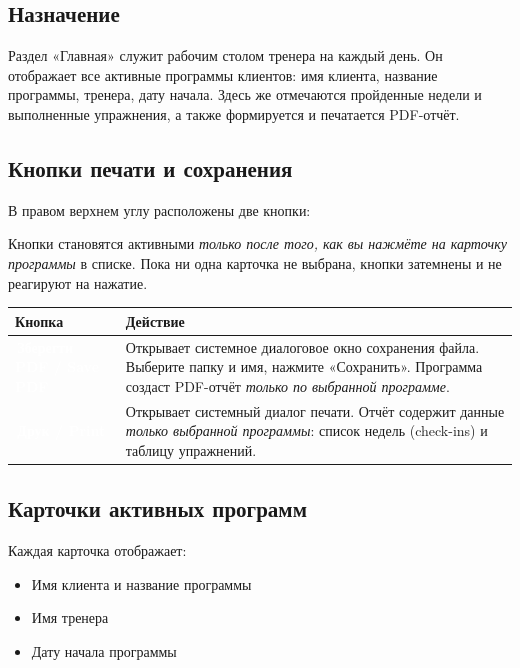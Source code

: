 \documentclass[12pt,a4paper]{article}
\newcommand{\btn}[2][primary]{%
  \textcolor{white}{\colorbox{#1}{\small\bfseries\,#2\,}}%
}
\begin{document}
\subsection{Назначение}

Раздел «Главная» служит рабочим столом тренера на каждый день.
Он отображает все активные программы клиентов: имя клиента, название
программы, тренера, дату начала. Здесь же отмечаются пройденные недели
и выполненные упражнения, а также формируется и печатается PDF-отчёт.

\subsection{Кнопки печати и сохранения}

В правом верхнем углу расположены две кнопки:

\begin{warningbox}
  Кнопки становятся активными \emph{только после того, как вы нажмёте
  на карточку программы} в списке. Пока ни одна карточка не выбрана,
  кнопки затемнены и не реагируют на нажатие.
\end{warningbox}

\bigskip
\begin{center}
\begin{tabularx}{0.9\textwidth}{>{\bfseries}lX}
  \toprule
  Кнопка & Действие \\
  \midrule
  \btn{Зберегти PDF / Save PDF} &
    Открывает системное диалоговое окно сохранения файла.
    Выберите папку и имя, нажмите «Сохранить».
    Программа создаст PDF-отчёт \emph{только по выбранной программе}. \\[4pt]
  \btn[success!70!black]{Друк / Print} &
    Открывает системный диалог печати.
    Отчёт содержит данные \emph{только выбранной программы}:
    список недель (check-ins) и таблицу упражнений. \\
  \bottomrule
\end{tabularx}
\end{center}

\subsection{Карточки активных программ}

Каждая карточка отображает:
\begin{itemize}
  \item Имя клиента и название программы
  \item Имя тренера
  \item Дату начала программы
\end{itemize}
\end{document}

